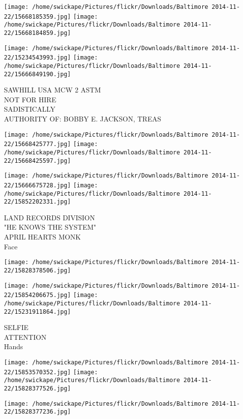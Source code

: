 \documentclass[10pt,letterpaper]{article}
\begin{document}
\texttt{[image: /home/swickape/Pictures/flickr/Downloads/Baltimore 2014-11-22/15668185359.jpg]}
\texttt{[image: /home/swickape/Pictures/flickr/Downloads/Baltimore 2014-11-22/15668184859.jpg]}

\texttt{[image: /home/swickape/Pictures/flickr/Downloads/Baltimore 2014-11-22/15234543993.jpg]}
\texttt{[image: /home/swickape/Pictures/flickr/Downloads/Baltimore 2014-11-22/15666849190.jpg]}

SAWHILL USA MCW 2 ASTM\\
NOT FOR HIRE\\
SADISTICALLY\\
AUTHORITY OF: BOBBY E. JACKSON, TREAS
\pagebreak

\texttt{[image: /home/swickape/Pictures/flickr/Downloads/Baltimore 2014-11-22/15668425777.jpg]}
\texttt{[image: /home/swickape/Pictures/flickr/Downloads/Baltimore 2014-11-22/15668425597.jpg]}

\texttt{[image: /home/swickape/Pictures/flickr/Downloads/Baltimore 2014-11-22/15666675728.jpg]}
\texttt{[image: /home/swickape/Pictures/flickr/Downloads/Baltimore 2014-11-22/15852202331.jpg]}

LAND RECORDS DIVISION\\
"HE KNOWS THE SYSTEM"\\
APRIL HEARTS MONK\\
Face
\pagebreak

\texttt{[image: /home/swickape/Pictures/flickr/Downloads/Baltimore 2014-11-22/15828378506.jpg]}

\vspace{0.25in}
\texttt{[image: /home/swickape/Pictures/flickr/Downloads/Baltimore 2014-11-22/15854206675.jpg]}
\texttt{[image: /home/swickape/Pictures/flickr/Downloads/Baltimore 2014-11-22/15231911864.jpg]}

SELFIE\\
ATTENTION\\
Hands
\pagebreak

\texttt{[image: /home/swickape/Pictures/flickr/Downloads/Baltimore 2014-11-22/15853570352.jpg]}
\texttt{[image: /home/swickape/Pictures/flickr/Downloads/Baltimore 2014-11-22/15828377526.jpg]}

\texttt{[image: /home/swickape/Pictures/flickr/Downloads/Baltimore 2014-11-22/15828377236.jpg]}
\end{document}
